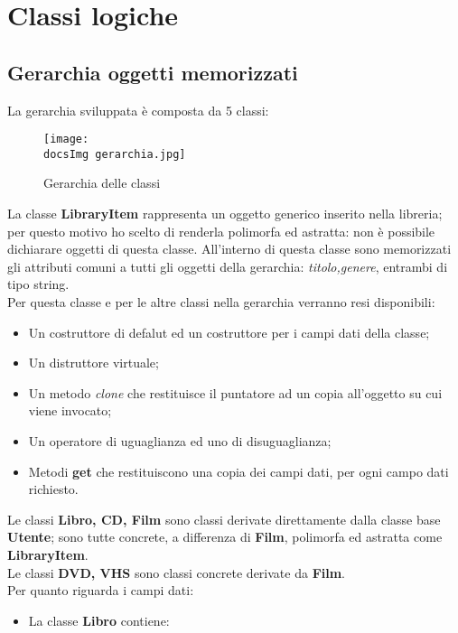 \section{Classi logiche}{
	\subsection{Gerarchia oggetti memorizzati}{
		La gerarchia sviluppata è composta da 5 classi: 
		
		\begin{figure}[h]
			\center
			\texttt{[image: \\docsImg gerarchia.jpg]}
			\caption{Gerarchia delle classi}
		\end{figure} 
		
		La classe \textbf{LibraryItem} rappresenta un oggetto generico inserito nella libreria; per questo motivo ho scelto di renderla polimorfa ed astratta: non è possibile dichiarare oggetti di questa classe. All'interno di questa classe sono memorizzati gli attributi comuni a tutti gli oggetti della gerarchia: \textit{titolo,genere}, entrambi di tipo string. \\
		Per questa classe e per le altre classi nella gerarchia verranno resi disponibili:
		\begin{itemize}\itemsep=0.5pt
			\item Un costruttore di defalut ed un costruttore per i campi dati della classe;
			\item Un distruttore virtuale;
			\item Un metodo \textit{clone} che restituisce il puntatore ad un copia all'oggetto su cui viene invocato;
			\item Un operatore di uguaglianza ed uno di disuguaglianza;
			\item Metodi \textbf{get} che restituiscono una copia dei campi dati, per ogni campo dati richiesto.
		\end{itemize}
			Le classi  \textbf{Libro, CD, Film} sono classi derivate direttamente dalla classe base \textbf{Utente}; sono tutte concrete, a differenza di \textbf{Film},  polimorfa ed astratta come \textbf{LibraryItem}. \\
			Le classi \textbf{DVD, VHS} sono classi concrete derivate da \textbf{Film}. \\
			Per quanto riguarda i campi dati:
			\begin{itemize}\itemsep=0.5pt
				\item La classe \textbf{Libro} contiene:

\end{itemize}}}
